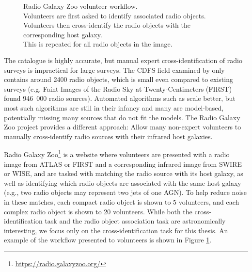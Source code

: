 \begin{figure}
\begin{subfigure}[t]{0.3\textwidth}
            \end{subfigure}
            \caption{Radio Galaxy Zoo volunteer workflow.\\
                \protect\makebox[1.5cm][r]{\ref{fig:rgz-interface-a}}
                    Volunteers are first asked to identify associated radio
                    objects.\\
                \protect\makebox[1.5cm][r]{\ref{fig:rgz-interface-b}}
                    Volunteers then cross-identify the radio objects with the
                    corresponding host galaxy.\\
                \protect\makebox[1.5cm][r]{\ref{fig:rgz-interface-c}}
                    This is repeated for all radio objects in the image.}
            \label{fig:rgz-interface}
        \end{figure}

    The \citeauthor{norris06} catalogue is highly accurate, but manual expert
    cross-identification of radio surveys is impractical for large surveys. The
    CDFS field examined by \citeauthor{norris06} only contains around 2400 radio
    objects, which is small even compared to existing surveys (e.g. Faint Images
    of the Radio Sky at Twenty-Centimeters (FIRST) \citep{becker95} found
    946~000 radio sources). Automated algorithms such as \citeauthor{fan15}
    scale better, but most such algorithms are still in their infancy
    \citep{norris16} and many are model-based, potentially missing many sources
    that do not fit the models. The Radio Galaxy Zoo project \citep{banfield15}
    provides a different approach: Allow many non-expert volunteers to manually
    cross-identify radio sources with their infrared host galaxies.

    Radio Galaxy Zoo\footnote{\url{https://radio.galaxyzoo.org/}} is a website
    where volunteers are presented with a radio image from ATLAS or FIRST and a
    corresponding infrared image from SWIRE or WISE, and are tasked with
    matching the radio source with its host galaxy, as well as identifying which
    radio objects are associated with the same host galaxy (e.g., two radio
    objects may represent two jets of one AGN). To help reduce noise in these
    matches, each compact radio object is shown to 5 volunteers, and each
    complex radio object is shown to 20 volunteers. While both the
    cross-identification task and the radio object association task are
    astronomically interesting, we focus only on the cross-identification task
    for this thesis. An example of the workflow presented to volunteers is shown
    in Figure \ref{fig:rgz-interface}.

